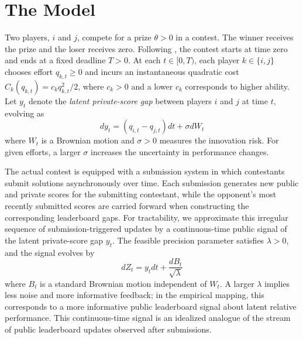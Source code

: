 \documentclass[mnsc]{informs3}
\begin{document}
\section{The Model}\label{contest-theory}

Two players, $i$ and $j$, compete for a prize {$\theta>0$} in a contest.
The winner receives the prize and the loser receives zero.
{Following \cite{Ryvkin2022Fight}, the contest starts at time zero and ends at a fixed deadline $T>0$.}
{At each $t\in[0,T)$, each player $k\in\{i,j\}$ chooses effort $q_{k,t}\geq0$ and incurs an instantaneous quadratic cost $C_k(q_{k,t})=c_kq_{k,t}^2/2$, where $c_k>0$ and a lower $c_k$ corresponds to higher ability.}
Let $y_t$ denote the {\color{black}\textit{latent private-score gap}} between players $i$ and $j$ at time $t$, evolving as
\begin{equation}\label{eq-state-dynamics}
	dy_t = (q_{i,t}-q_{j,t})dt + \sigma dW_t
\end{equation}
where $W_t$ is a Brownian motion and $\sigma>0$ measures the innovation risk.
{For given efforts, a larger $\sigma$ increases the uncertainty in performance changes.}

The actual contest is equipped with a submission system in which contestants submit solutions asynchronously over time. Each submission generates new public and private scores for the submitting contestant, while the opponent's most recently submitted scores are carried forward when constructing the corresponding leaderboard gaps.
For tractability, we approximate this irregular sequence of submission-triggered updates by a continuous-time public signal of the {\color{black}latent private-score gap} $y_t$.
The feasible precision parameter satisfies $\lambda>0$, and the signal evolves by
\begin{equation}\label{signal}
	dZ_{t} = y_{t}dt + \frac{dB_{t}}{\sqrt{\lambda}}
\end{equation}
where $B_{t}$ is a standard Brownian motion independent of $W_t$.
A larger $\lambda$ implies less noise and more informative feedback; in the empirical mapping, this corresponds to a more informative public leaderboard signal about latent relative performance.
This continuous-time signal is an idealized analogue of the stream of public leaderboard updates observed after submissions.
\end{document}
